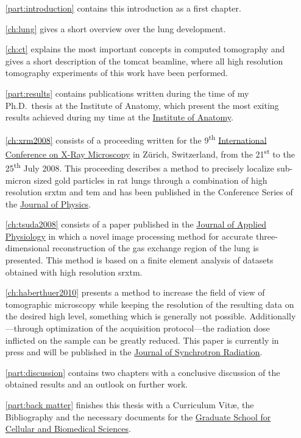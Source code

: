 \begin{itemize}
	\item [\autoref{part:introduction}] contains this introduction as a first chapter.
		
		\autoref{ch:lung} gives a short overview over the lung development.
	
		\autoref{ch:ct} explains the most important concepts in computed tomography and gives a short description of the \ac{tomcat} beamline, where all high resolution tomography experiments of this work have been performed.
	\item [\autoref{part:results}] contains publications written during the time of my Ph.D.\ thesis at the Institute of Anatomy, which present the most exiting results achieved during my time at the \href{http://www.ana.unibe.ch/index_e.jsp}{Institute of Anatomy}.
	
		\autoref{ch:xrm2008} consists of a proceeding written for the 9\textsuperscript{th} \href{http://xrm2008.web.psi.ch/}{International Conference on X-Ray Microscopy} in Zürich, Switzerland, from the 21\textsuperscript{st} to the 25\textsuperscript{th} July 2008. This proceeding describes a method to precisely localize sub-micron sized gold particles in rat lungs through a combination of high resolution \acl{srxtm} and \acl{tem} and has been published in the Conference Series of the \href{http://iopscience.iop.org/1742-6596/}{Journal of Physics}.
		
		\autoref{ch:tsuda2008} consists of a paper published in the \href{http://jap.physiology.org/}{Journal of Applied Physiology} in which a novel image processing method for accurate three-dimensional reconstruction of the gas exchange region of the lung is presented. This method is based on a finite element analysis of datasets obtained with high resolution \acl{srxtm}.

		\autoref{ch:haberthuer2010} presents a method to increase the field of view of tomographic microscopy while keeping the resolution of the resulting data on the desired high level, something which is generally not possible. Additionally---through optimization of the acquisition protocol---the radiation dose inflicted on the sample can be greatly reduced. This paper is currently in press and will be published in the \href{http://journals.iucr.org/s/}{Journal of Synchrotron Radiation}.

	\item [\autoref{part:discussion}] contains two chapters with a conclusive discussion of the obtained results and an outlook on further work.
	\item [\autoref{part:back matter}] finishes this thesis with a Curriculum Vit\ae, the Bibliography and the necessary documents for the \href{http://www.gcb.unibe.ch}{Graduate School for Cellular and Biomedical Sciences}.
\end{itemize}

